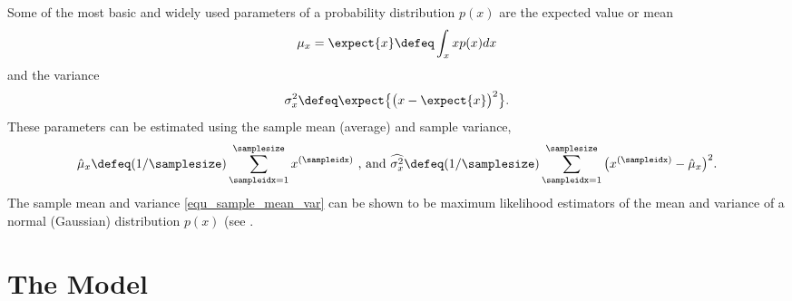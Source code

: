 \documentclass[12pt]{report}
\begin{document}
Some of the most basic and widely used parameters of a probability 
distribution $p(x)$ are the expected value or mean 
$$\mu_{x} = \expect\{x\} \defeq \int_{x} x p(x) dx$$ 
and the variance 
$$\sigma_{x}^{2} \defeq \expect\big\{\big(x-\expect\{x\}\big)^{2}\big\}.$$ 
These parameters can be estimated using the sample mean 
(average) and sample variance, 
\begin{equation} 
\label{equ_sample_mean_var}
\hat{\mu}_{x} \defeq (1/\samplesize) \sum_{\sampleidx=1}^{\samplesize} x^{(\sampleidx)}\mbox{ , and } \widehat{\sigma^{2}_{x}} \defeq (1/\samplesize) \sum_{\sampleidx=1}^{\samplesize} \big( x^{(\sampleidx)} - \hat{\mu}_{x} \big)^{2}.  
\end{equation} 
The sample mean and variance \eqref{equ_sample_mean_var} 
can be shown to be maximum likelihood estimators of the mean 
and variance of a normal (Gaussian) distribution $p(x)$ (see \cite[Chapter 2.3.4]{BishopBook}. 




\section{The Model}
\label{sec_hypo_space}

%
\end{document}
